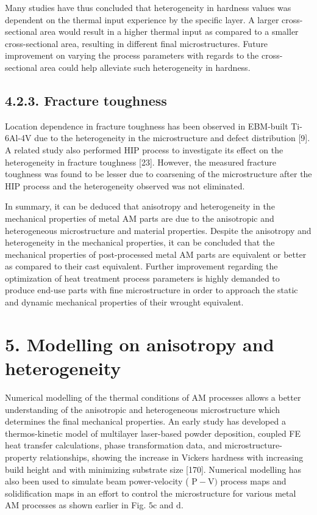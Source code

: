 \documentclass[10pt]{article}
\begin{document}
Many studies have thus concluded that heterogeneity in hardness values was dependent on the thermal input experience by the specific layer. A larger cross-sectional area would result in a higher thermal input as compared to a smaller cross-sectional area, resulting in different final microstructures. Future improvement on varying the process parameters with regards to the cross-sectional area could help alleviate such heterogeneity in hardness.

\subsection*{4.2.3. Fracture toughness}
Location dependence in fracture toughness has been observed in EBM-built Ti-6Al-4V due to the heterogeneity in the microstructure and defect distribution [9]. A related study also performed HIP process to investigate its effect on the heterogeneity in fracture toughness [23]. However, the measured fracture toughness was found to be lesser due to coarsening of the microstructure after the HIP process and the heterogeneity observed was not eliminated.

In summary, it can be deduced that anisotropy and heterogeneity in the mechanical properties of metal AM parts are due to the anisotropic and heterogeneous microstructure and material properties. Despite the anisotropy and heterogeneity in the mechanical properties, it can be concluded that the mechanical properties of post-processed metal AM parts are equivalent or better as compared to their cast equivalent. Further improvement regarding the optimization of heat treatment process parameters is highly demanded to produce end-use parts with fine microstructure in order to approach the static and dynamic mechanical properties of their wrought equivalent.

\section*{5. Modelling on anisotropy and heterogeneity}
Numerical modelling of the thermal conditions of AM processes allows a better understanding of the anisotropic and heterogeneous microstructure which determines the final mechanical properties. An early study has developed a thermos-kinetic model of multilayer laser-based powder deposition, coupled FE heat transfer calculations, phase transformation data, and microstructure-property relationships, showing the increase in Vickers hardness with increasing build height and with minimizing substrate size [170]. Numerical modelling has also been used to simulate beam power-velocity ( $\mathrm{P}-\mathrm{V})$ process maps and solidification maps in an effort to control the microstructure for various metal AM processes as shown earlier in Fig. $5 \mathrm{c}$ and $\mathrm{d}$.
\end{document}
